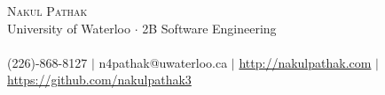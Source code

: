 \documentclass[10pt]{article}
\begin{document}
\small
\smallskip
\vspace*{-45pt}

\begin{center}
  {\Huge \scshape {Nakul Pathak}} \\
  \vspace*{6pt} 
{\fontsize{10}{1}\selectfont University of Waterloo $\cdot$ 2B Software Engineering} \\
\vspace{-4pt}
\hspace*{-18pt} \hrulefill \\
\vspace{2pt}
\hspace*{-18pt} (226)-868-8127 $|$ n4pathak@uwaterloo.ca $|$ \url{http://nakulpathak.com} $|$  \url{https://github.com/nakulpathak3}
\vspace{-5pt}
\end{center}

\vspace{8pt}
\end{document}
